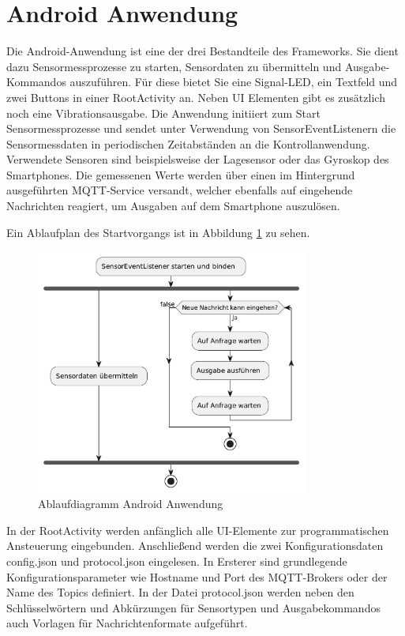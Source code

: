 \documentclass[11pt,a4paper]{report}
\begin{document}
\section{Android Anwendung}\label{chap:app}
Die Android-Anwendung ist eine der drei Bestandteile des Frameworks.
Sie dient dazu Sensormessprozesse zu starten, Sensordaten zu übermitteln und Ausgabe-Kommandos auszuführen.
Für diese bietet Sie eine Signal-LED, ein Textfeld und zwei Buttons in einer RootActivity an.
Neben UI Elementen gibt es zusätzlich noch eine Vibrationsausgabe. 
Die Anwendung initiiert zum Start Sensormessprozesse und sendet unter Verwendung von SensorEventListenern die Sensormessdaten in periodischen Zeitabständen an die Kontrollanwendung.
Verwendete Sensoren sind beispielsweise der Lagesensor oder das Gyroskop des Smartphones.
Die gemessenen Werte werden über einen im Hintergrund ausgeführten MQTT-Service versandt, welcher ebenfalls auf eingehende Nachrichten reagiert, um Ausgaben auf dem Smartphone auszulösen.

Ein Ablaufplan des Startvorgangs ist in Abbildung \ref{fig:app_flow} zu sehen.
\begin{figure}[htbp]
  \centering
  \includegraphics[width=0.8\textwidth]{images/app_ablauf}
  \caption{Ablaufdiagramm Android Anwendung}
  \label{fig:app_flow}
\end{figure}
In der RootActivity werden anfänglich alle UI-Elemente zur programmatischen Ansteuerung eingebunden.
Anschließend werden die zwei Konfigurationsdaten config.json und protocol.json eingelesen.
In Ersterer sind grundlegende Konfigurationsparameter wie Hostname und Port des MQTT-Brokers oder der Name des Topics definiert.
In der Datei protocol.json werden neben den Schlüsselwörtern und Abkürzungen für Sensortypen und Ausgabekommandos auch Vorlagen für Nachrichtenformate aufgeführt.
\end{document}
